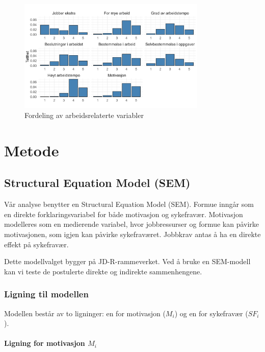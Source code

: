 \documentclass[
  12pt,
  a4paper,
  DIV=11,
  numbers=noendperiod]{scrartcl}
\let\oldparagraph\paragraph
\renewcommand{\paragraph}[1]{\oldparagraph{#1}\mbox{}}
\begin{document}
\vspace{-0.5cm}
\begin{figure}[H]
\caption{Fordeling av arbeidsrelaterte variabler}
\label{fig:kontrollvariabler}
\centering
\includegraphics[width=0.8\textwidth]{dokumentobjekter/figurer/fig_kontrollvariabler.png}
\end{figure}
\vspace{-1cm}

\newpage

\section{Metode}\label{sec-metode}

\subsection{Structural Equation Model
(SEM)}\label{structural-equation-model-sem}

Vår analyse benytter en Structural Equation Model (SEM). Formue inngår
som en direkte forklaringsvariabel for både motivasjon og sykefravær.
Motivasjon modelleres som en medierende variabel, hvor jobbressurser og
formue kan påvirke motivasjonen, som igjen kan påvirke sykefraværet.
Jobbkrav antas å ha en direkte effekt på sykefravær.

Dette modellvalget bygger på JD-R-rammeverket. Ved å bruke en SEM-modell
kan vi teste de postulerte direkte og indirekte sammenhengene.

\subsubsection{Ligning til modellen}\label{ligning-til-modellen}

Modellen består av to ligninger: en for motivasjon (\(M_i\)) og en for
sykefravær (\(SF_i\)).

\paragraph{\texorpdfstring{Ligning for motivasjon
\(M_i\)}{Ligning for motivasjon M\_i}}\label{ligning-for-motivasjon-m_i}
\end{document}
